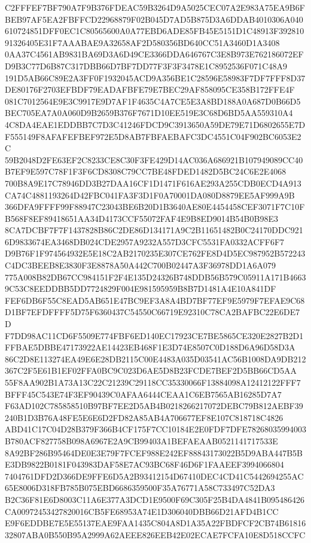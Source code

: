 \documentclass[UTF8,fontset=fandol,zihao=-4,a4paper]{ctexart}
\begin{document}
{{C2FFFEF7BF790A7F9B376FDEAC59B3264D9A5025CEC07A2E983A75EA9B6FBEB97AF5EA2FBFFCD22968879F02B045D7AD5B875D3A6DDAB4010306A040
610724851DFF0EC1C80565600A0A77EBD6ADE85FB45E5151D1C48913F39281091326405E31F7AAABAE9A32658AF2D580356BD640CC51A3460D1A3408
0AA37C4561AB9831BA69D3A6D49CE3366DDA646767C3E8B973E762186072EFD9B3C77D6B87C317DBB66D7BF7DD77F3F3F3478E1C8952536F071C48A9
191D5AB66C89E2A3FF0F1932045ACD9A356BE1C28596E58983F7DF7FFF8D37DE80176F2703EFBDF79EADAFBFE79E7BEC29AF858095CE358B172FFE4F
081C7012564E9E3C9917E9D7AF1F4635C4A7CE5E3A8BD188A0A687D0B66D5BEC705EA7A0A060D9B2659B376F7671D10EE519E3C68D6BD5AA559310A4
4C8DA4EAE1EDDBB7C7D3C41246FDCD9C3913650A59DE79E71D6802655E7DF555149F8AFAFEFBEF972E5D8AB7FBFAEBAFC3DC4551C04F902BC6053E2C
59B2048D2FE63EF2C8233CE8C30F3FE429D14AC036A686921B107949089CC40B7EF9E597C78F1F3F6CD8308C79CC7BE48FDED1482D5BC24C6E2E4068
700B8A9E17C78946DD3B27DAA16CF1D1471F616AE293A255CDB0ECD4A913CA74C4881193264D42FBC041FA3F3D1F0A70001DA080D8879EE5AF999A9B
366DFA9FFFF99F88947C23043BE6B20D1B3640AE80E4454458CEF3071F7C10FB568F8EF89418651AA34D4173CCF55072FAF4E9B8ED9014B54B0B98E3
8CA7DCBF7F7F1437828B86C2DE86D134171A9C2B11651482B0C24170DDC9216D9833674EA3468DB024CDE2957A9232A557D3CFC5531FA0332ACFF6F7
D9B76F1F974564932E5E18C2AB2170235E307CE762FE8D4D5EC987952B572243C4DC3BEEB8E3830F3E8878A50A442C700B02447A3F36978DD1A6A079
775A008B82DB67CC984151F2F4E135D24326B748DDB56B579C05911A171B46639C53C8EEDDBB5DD7724829F004E981595959B8B7D1481A4E10A841DF
FEF6DB6F55C8EAD5AB651E47BC9EF3A8A4BD7BF77EF9E5979F7EFAE9C68D1BF7EFDFFFF5D75F6360437C54550C66719E92310C78CA2BAFBC22E6DE7D
F7DD98AC11CD6F5509E774FBF6ED140EC17923CE7BE5865CE320E2827B2D1FFBAE5DBBE47173922AE14423EB468F1E3D74E8507C0D188D6A96D58D3A
86C2D8E113274EA49E6E28DB2115C00E4483A035D03541AC56B1008DA9DB212367C2F5E61B1EF02FFA0BC9C023D6AE5D8B23FCDE7BEF2D5BB66CD5AA
55F8AA902B1A73A13C22C21239C29118CC35330066F13884098A12412122FFF7BFFF45C543E74F3EF90439C0AFAA6444CEAA1C6EB7565AB16285D7A7
F63AD102C785858510B97BF7EE2D5AB4B0218266217072DEBC79B812AEBF39240B1D3B76A48FE5E6E6D2FD82A85AB4A706677EF8E107C818718C4826
ABD41C17C04D28B379F366B4CF175F7CC10184E2E0FDF7DFE78268035994003B780ACF827758B098A6967E2A9CB99403A1BEFAEAAB0521141717533E
8A92BF286B95464DE0E3E79F7FCEF988E242EF88843173022B5D9ABA447B5BE3DB9822B0181F043983DAF58E7AC93BC68F46D6F1FAAEEF3994066804
7404761DFD2D366DE9FFE6D5A2B93412154D67410DEC4CD41C5442694255AC65E8006D318FB785B075EBD6686359500F35A76771A58C733497C52DA3
B2C36F81E6D8003C11A6E377A3DCD1E9500F69C305F25B4DA4841B095486426CA00972453427820016CB5FE68953A74E1D306040DBB66D21AFD4B1CC
E9F6EDDBE7E5E55137EAE9FAA1435C804A8D1A35A22FBDFCF2CB74B6181632807ABA0B550B95A2999A62AEEE826EEB42E02ECAE7FCFA10E8D518CCFC
}}
\end{document}
